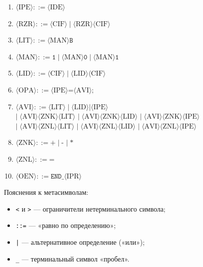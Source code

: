\documentclass[a4paper,14pt]{extarticle}
\begin{document}
\begin{enumerate}
  \item $\langle\text{IPE}\rangle ::= \langle\text{IDE}\rangle$
  \item $\langle\text{RZR}\rangle ::= \langle\text{CIF}\rangle \mid \langle\text{RZR}\rangle\langle\text{CIF}\rangle$
  \item $\langle\text{LIT}\rangle ::= \langle\text{MAN}\rangle\texttt{B}$
  \item $\langle\text{MAN}\rangle ::= \texttt{1} \mid \langle\text{MAN}\rangle\texttt{0} \mid \langle\text{MAN}\rangle\texttt{1}$
  \item \textit{$\langle\text{LID}\rangle ::= \langle\text{CIF}\rangle \mid \langle\text{LID}\rangle\langle\text{CIF}\rangle$}
  \item $\langle\text{OPA}\rangle ::= \langle\text{IPE}\rangle\texttt{=}\langle\text{AVI}\rangle\texttt{;}$
  \item $\langle\text{AVI}\rangle ::= \langle\text{LIT}\rangle \mid $\textit{$\langle\text{LID}\rangle$}$\mid \langle\text{IPE}\rangle$\\
        $\mid\; \langle\text{AVI}\rangle\langle\text{ZNK}\rangle\langle\text{LIT}\rangle$
        \textit{$\mid\; \langle\text{AVI}\rangle\langle\text{ZNK}\rangle\langle\text{LID}\rangle$}
        $\mid\; \langle\text{AVI}\rangle\langle\text{ZNK}\rangle\langle\text{IPE}\rangle$\\
        \textit{$\mid\; \langle\text{AVI}\rangle\langle\text{ZNL}\rangle\langle\text{LIT}\rangle$}
        \textit{$\mid\; \langle\text{AVI}\rangle\langle\text{ZNL}\rangle\langle\text{LID}\rangle$}
        \textit{$\mid\; \langle\text{AVI}\rangle\langle\text{ZNL}\rangle\langle\text{IPE}\rangle$}
  \item $\langle\text{ZNK}\rangle ::= \texttt{+} \mid \texttt{-}$ \textit{$\mid\; \texttt{*}$}
  \item \textit{$\langle\text{ZNL}\rangle ::= \texttt{=}$}
  \item $\langle\text{OEN}\rangle ::= \texttt{END\_}\langle\text{IPR}\rangle$
\end{enumerate}

Пояснения к метасимволам:
\begin{itemize}
  \item \texttt{<} и \texttt{>} — ограничители нетерминального символа;
  \item \texttt{::=} — «равно по определению»;
  \item \texttt{|} — альтернативное определение («или»);
  \item \texttt{\_} — терминальный символ «пробел».
\end{itemize}
\end{document}
